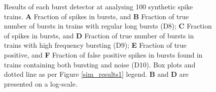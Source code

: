 \documentclass[12pt, titlepage]{article}
\begin{document}
		\begin{figure}
			\centering
			\caption{Results of each burst detector at analysing 100 synthetic spike trains. \textbf{A} Fraction of spikes in bursts, and \textbf{B} Fraction of true number of bursts in trains with regular long bursts (D8); \textbf{C} Fraction of spikes in bursts, and \textbf{D} Fraction of true number of bursts in trains with high frequency bursting (D9); \textbf{E} Fraction of true positive, and \textbf{F} Fraction of false positive spikes in bursts found in trains containing both bursting and noise (D10). Box plots and dotted line as per Figure \ref{sim_results1} legend. \textbf{B} and \textbf{D} are presented on a log-scale.}
			\label{sim_results2}
		\end{figure}	
\end{document}
